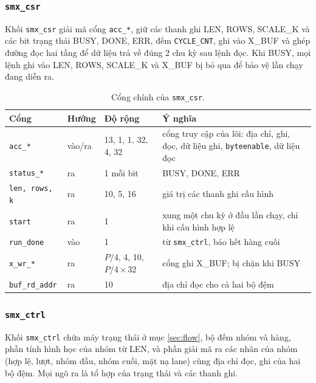 \subsubsection{\texttt{smx\_csr}}

Khối \texttt{smx\_csr} giải mã cổng \texttt{acc\_*}, giữ các thanh ghi LEN, ROWS, SCALE\_K và các bit trạng thái BUSY, DONE, ERR, đếm \texttt{CYCLE\_CNT}, ghi vào X\_BUF và ghép đường đọc hai tầng để dữ liệu trả về đúng 2 chu kỳ sau lệnh đọc. Khi BUSY, mọi lệnh ghi vào LEN, ROWS, SCALE\_K và X\_BUF bị bỏ qua để bảo vệ lần chạy đang diễn ra.

\begin{table}[htbp]
\centering
\small
\begin{tabular}{p{2.7cm}p{1.2cm}p{1.9cm}p{7.2cm}}
\toprule
Cổng & Hướng & Độ rộng & Ý nghĩa \\
\midrule
\texttt{acc\_*} & vào/ra & 13, 1, 1, 32, 4, 32 & cổng truy cập của lõi: địa chỉ, ghi, đọc, dữ liệu ghi, \texttt{byteenable}, dữ liệu đọc \\
\texttt{status\_*} & ra & 1 mỗi bit & BUSY, DONE, ERR \\
\texttt{len, rows, k} & ra & 10, 5, 16 & giá trị các thanh ghi cấu hình \\
\texttt{start} & ra & 1 & xung một chu kỳ ở đầu lần chạy, chỉ khi cấu hình hợp lệ \\
\texttt{run\_done} & vào & 1 & từ \texttt{smx\_ctrl}, báo hết hàng cuối \\
\texttt{x\_wr\_*} & ra & $P/4$, 4, 10, $P/4 \times 32$ & cổng ghi X\_BUF; bị chặn khi BUSY \\
\texttt{buf\_rd\_addr} & ra & 10 & địa chỉ đọc cho cả hai bộ đệm \\
\bottomrule
\end{tabular}
\caption{Cổng chính của \texttt{smx\_csr}.}
\label{tab:p-csr}
\end{table}


\subsubsection{\texttt{smx\_ctrl}}

Khối \texttt{smx\_ctrl} chứa máy trạng thái ở mục \ref{sec:flow}, bộ đếm nhóm và hàng, phần tính hình học của nhóm từ LEN, và phần giải mã ra các nhãn của nhóm (hợp lệ, lượt, nhóm đầu, nhóm cuối, mặt nạ lane) cùng địa chỉ đọc, ghi của hai bộ đệm. Mọi ngõ ra là tổ hợp của trạng thái và các thanh ghi.

